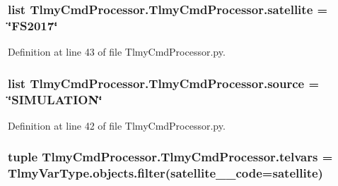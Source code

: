 \hypertarget{namespace_tlmy_cmd_processor_1_1_tlmy_cmd_processor_a5cf95a9cff868554c46d7a901df74673}{}
\subsubsection[{satellite}]{\setlength{\rightskip}{0pt plus 5cm}list Tlmy\+Cmd\+Processor.\+Tlmy\+Cmd\+Processor.\+satellite = \char`\"{}F\+S2017\char`\"{}}\label{namespace_tlmy_cmd_processor_1_1_tlmy_cmd_processor_a5cf95a9cff868554c46d7a901df74673}


Definition at line 43 of file Tlmy\+Cmd\+Processor.\+py.

\hypertarget{namespace_tlmy_cmd_processor_1_1_tlmy_cmd_processor_acef2a3d30bda6af9c56309eea6b12246}{}
\subsubsection[{source}]{\setlength{\rightskip}{0pt plus 5cm}list Tlmy\+Cmd\+Processor.\+Tlmy\+Cmd\+Processor.\+source = \char`\"{}S\+I\+M\+U\+L\+A\+T\+I\+O\+N\char`\"{}}\label{namespace_tlmy_cmd_processor_1_1_tlmy_cmd_processor_acef2a3d30bda6af9c56309eea6b12246}


Definition at line 42 of file Tlmy\+Cmd\+Processor.\+py.

\hypertarget{namespace_tlmy_cmd_processor_1_1_tlmy_cmd_processor_a9d8c45d2e203eaa7eb7be5ece0116d39}{}
\subsubsection[{telvars}]{\setlength{\rightskip}{0pt plus 5cm}tuple Tlmy\+Cmd\+Processor.\+Tlmy\+Cmd\+Processor.\+telvars = Tlmy\+Var\+Type.\+objects.\+filter(satellite\+\_\+\+\_\+code={\bf satellite})}\label{namespace_tlmy_cmd_processor_1_1_tlmy_cmd_processor_a9d8c45d2e203eaa7eb7be5ece0116d39}



